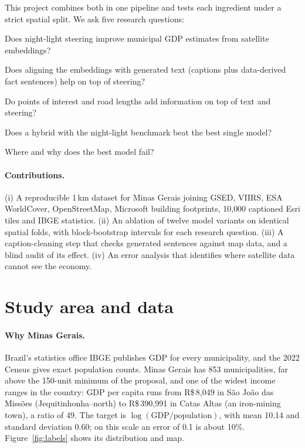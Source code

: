 \documentclass[11pt,a4paper]{article}
\begin{document}
This project combines both in one pipeline and tests each ingredient under a strict spatial split. We ask five
research questions:
\begin{description}[leftmargin=1.2cm,style=nextline]
\item[RQ1] Does night-light steering improve municipal GDP estimates from satellite embeddings?
\item[RQ2] Does aligning the embeddings with generated text (captions plus data-derived fact sentences) help on top of steering?
\item[RQ3] Do points of interest and road lengths add information on top of text and steering?
\item[RQ4] Does a hybrid with the night-light benchmark beat the best single model?
\item[RQ5] Where and why does the best model fail?
\end{description}

\paragraph{Contributions.} (i) A reproducible 1\,km dataset for Minas Gerais joining GSED, VIIRS, ESA WorldCover,
OpenStreetMap, Microsoft building footprints, 10{,}000 captioned Esri tiles and IBGE statistics. (ii) An ablation of
twelve model variants on identical spatial folds, with block-bootstrap intervals for each research question.
(iii) A caption-cleaning step that checks generated sentences against map data, and a blind audit of its effect.
(iv) An error analysis that identifies where satellite data cannot see the economy.

\section{Study area and data}

\paragraph{Why Minas Gerais.} Brazil's statistics office IBGE publishes GDP for every municipality, and the 2022
Census gives exact population counts. Minas Gerais has 853 municipalities, far above the 150-unit minimum of the
proposal, and one of the widest income ranges in the country: GDP per capita runs from R\$\,8{,}049 in São João das
Missões (Jequitinhonha--north) to R\$\,390{,}991 in Catas Altas (an iron-mining town), a ratio of 49. The target is
$\log(\text{GDP}/\text{population})$, with mean 10.14 and standard deviation 0.60; on this scale an error of 0.1 is
about 10\%. Figure~\ref{fig:labels} shows its distribution and map.
\end{document}
